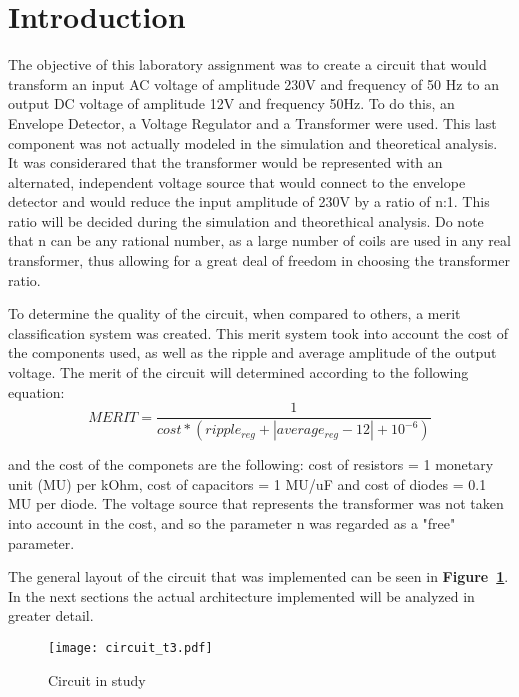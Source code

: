 \section{Introduction}
\label{sec:introduction}


\par The objective of this laboratory assignment was to create a circuit that would transform an input AC voltage of amplitude 230V and frequency of 50 Hz to an output DC voltage of amplitude 12V and frequency 50Hz. To do this, an Envelope Detector, a Voltage Regulator and a Transformer were used. This last component was not actually modeled in the simulation and theoretical analysis. It was considerared that the transformer would be represented with an alternated, independent voltage source that would connect to the envelope detector and would reduce the input amplitude of 230V by a ratio of n:1. This ratio will be decided during the simulation and theorethical analysis. Do note that n can be any rational number, as a large number of coils are used in any real transformer, thus allowing for a great deal of freedom in choosing the transformer ratio.\par
To determine the quality of the circuit, when compared to others, a merit classification system was created. This merit system took into account the cost of the components used, as well as the ripple and average amplitude of the output voltage. The merit of the circuit will determined according to the following equation: 
\begin {equation}
	 MERIT = \frac{1}{cost*(ripple_{reg} + |average_{reg} - 12| + 10^{-6})}   	
	\label{eq:i1}
\end{equation}

and the cost of the componets are the following: cost of resistors = 1 monetary unit (MU) per kOhm, cost of capacitors = 1 MU/uF
and cost of diodes = 0.1 MU per diode. The voltage source that represents the transformer was not taken into account in the cost, and so the parameter n was regarded as a "free" parameter.
 
The general layout of the circuit that was implemented can be seen in \textbf{Figure~\ref{fig:circuit_t3}}. In the next sections the actual architecture implemented will be analyzed in greater detail.\par
\begin{figure}[h] \centering
\texttt{[image: circuit\_t3.pdf]}
\vspace{-6cm}
\caption{Circuit in study}
\label{fig:circuit_t3}
\end{figure}


